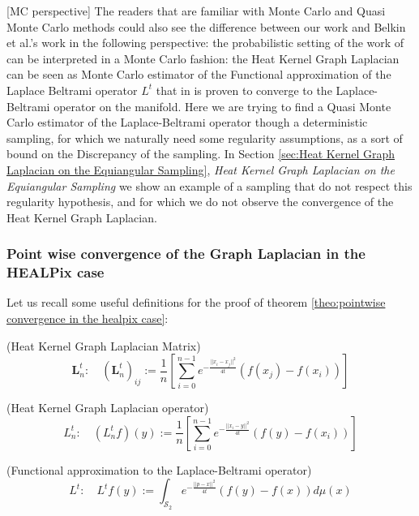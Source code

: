 [MC perspective] The readers that are familiar with Monte Carlo and Quasi Monte Carlo methods could also see the difference between our work and Belkin et al.'s work in the following perspective: the probabilistic setting of the work of \cite{Belkin:2005:TTF:2138147.2138189} can be interpreted in a Monte Carlo fashion: the Heat Kernel Graph Laplacian can be seen as Monte Carlo estimator of the Functional approximation of the Laplace Beltrami operator $L^t$ that in \cite{1} is proven to converge to the Laplace-Beltrami operator on the manifold. Here we are trying to find a Quasi Monte Carlo estimator of the Laplace-Beltrami operator though a deterministic sampling, for which we naturally need some regularity assumptions, as a sort of bound on the Discrepancy of the sampling. In Section \ref{sec:Heat Kernel Graph Laplacian on the Equiangular Sampling}, \textit{Heat Kernel Graph Laplacian on the Equiangular Sampling} we show an example of a sampling that do not respect this regularity hypothesis, and for which we do not observe the convergence of the Heat Kernel Graph Laplacian.\\

\subsubsection{Point wise convergence of the Graph Laplacian in the HEALPix case}

Let us recall some useful definitions for the proof of theorem \ref{theo:pointwise convergence in the healpix case}:
\vspace{0.5cm}
\begin{definition}{}(Heat Kernel Graph Laplacian Matrix)\\
	\label{def:Heat Kernel Graph Laplacian Matrix}
	$$\mathbf L_n^t:\quad(\mathbf L_n^t)_{ij} := \frac{1}{n}\left[ \sum_{i=0}^{n-1} e^{-\frac{||x_i-x_j||^2}{4t}}\left(f(x_j)-f(x_i)\right)\right]$$
\end{definition}
\vspace{0.5cm}
\begin{definition}{}(Heat Kernel Graph Laplacian operator)\\
	\label{def:Heat Kernel Graph Laplacian operator}
	$$L_n^t:\quad(L_n^tf)(y) := \frac{1}{n}\left[ \sum_{i=0}^{n-1} e^{-\frac{||x_i-y||^2}{4t}}\left(f(y)-f(x_i)\right)\right]$$
\end{definition}
\vspace{0.5cm}
\begin{definition}{}(Functional approximation to the Laplace-Beltrami operator)\\ \label{eq: my L^t}
	\label{def:Functional approximation to the Laplace-Beltrami operator}
	$$L^t:\quad L^tf(y) := \int_{\mathcal S_2}e^{-\frac{||p-x||^2}{4t}}\left(f(y)-f(x)\right)d\mu(x)$$
\end{definition}
\vspace{0.5cm}

